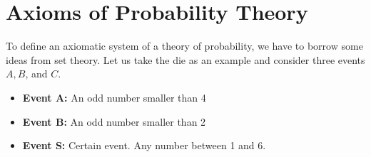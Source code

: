     \section{Axioms of Probability Theory}
        To define an axiomatic system of a theory of probability, we have to borrow some ideas from set theory. Let us take the die as an example and consider three events $A,B$, and $C$. 
        \begin{itemize}
            \item \textbf{Event A:} An odd number smaller than 4
            \item \textbf{Event B:} An odd number smaller than 2
            \item \textbf{Event S:} Certain event. Any number between 1 and 6.
        \end{itemize}
        \begin{figure}[H]
            \centering
                \begin{tikzpicture}[x=0.75pt,y=0.75pt,yscale=-1,xscale=1]
                    

\end{tikzpicture}
\end{figure}

